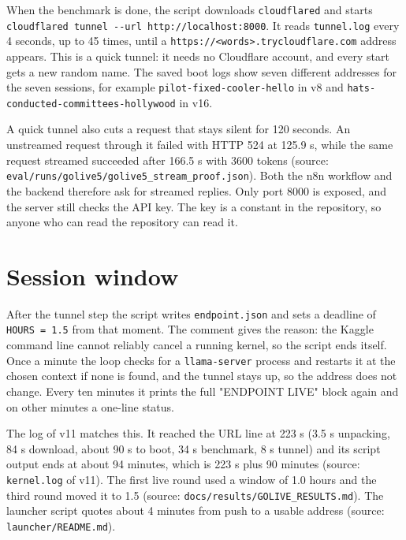 When the benchmark is done, the script downloads \texttt{cloudflared} and starts \texttt{cloudflared tunnel -\allowbreak{}-\allowbreak{}url http:\allowbreak{}/\allowbreak{}/\allowbreak{}localhost:\allowbreak{}8000}. It reads \texttt{tunnel.\allowbreak{}log} every 4 seconds, up to 45 times, until a \texttt{https:\allowbreak{}/\allowbreak{}/\allowbreak{}\textless{}words\textgreater{}.\allowbreak{}trycloudflare.\allowbreak{}com} address appears. This is a quick tunnel: it needs no Cloudflare account, and every start gets a new random name. The saved boot logs show seven different addresses for the seven sessions, for example \texttt{pilot-\allowbreak{}fixed-\allowbreak{}cooler-\allowbreak{}hello} in v8 and \texttt{hats-\allowbreak{}conducted-\allowbreak{}committees-\allowbreak{}hollywood} in v16.

A quick tunnel also cuts a request that stays silent for 120 seconds. An unstreamed request through it failed with HTTP 524 at 125.9 s, while the same request streamed succeeded after 166.5 s with 3600 tokens (source: \texttt{eval/\allowbreak{}runs/\allowbreak{}golive5/\allowbreak{}golive5\_\allowbreak{}stream\_\allowbreak{}proof.\allowbreak{}json}). Both the n8n workflow and the backend therefore ask for streamed replies. Only port 8000 is exposed, and the server still checks the API key. The key is a constant in the repository, so anyone who can read the repository can read it.

\section{Session window}

After the tunnel step the script writes \texttt{endpoint.\allowbreak{}json} and sets a deadline of \texttt{HOURS = 1.\allowbreak{}5} from that moment. The comment gives the reason: the Kaggle command line cannot reliably cancel a running kernel, so the script ends itself. Once a minute the loop checks for a \texttt{llama-\allowbreak{}server} process and restarts it at the chosen context if none is found, and the tunnel stays up, so the address does not change. Every ten minutes it prints the full "ENDPOINT LIVE" block again and on other minutes a one-line status.

The log of v11 matches this. It reached the URL line at 223 s (3.5 s unpacking, 84 s download, about 90 s to boot, 34 s benchmark, 8 s tunnel) and its script output ends at about 94 minutes, which is 223 s plus 90 minutes (source: \texttt{kernel.\allowbreak{}log} of v11). The first live round used a window of 1.0 hours and the third round moved it to 1.5 (source: \texttt{docs/\allowbreak{}results/\allowbreak{}GOLIVE\_\allowbreak{}RESULTS.\allowbreak{}md}). The launcher script quotes about 4 minutes from push to a usable address (source: \texttt{launcher/\allowbreak{}README.\allowbreak{}md}).

